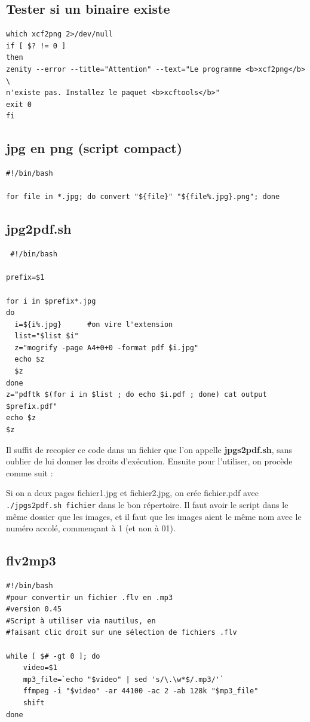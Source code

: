 \documentclass[a4paper,twoside]{article}
\begin{document}
\subsection{Tester si un binaire existe}
\begin{verbatim}
which xcf2png 2>/dev/null
if [ $? != 0 ]
then
zenity --error --title="Attention" --text="Le programme <b>xcf2png</b> \
n'existe pas. Installez le paquet <b>xcftools</b>"
exit 0
fi
\end{verbatim}


\subsection{jpg en png (script compact)}
\begin{verbatim}
#!/bin/bash

for file in *.jpg; do convert "${file}" "${file%.jpg}.png"; done
\end{verbatim}


\subsection{jpg2pdf.sh}
\begin{verbatim}
 #!/bin/bash

prefix=$1

for i in $prefix*.jpg
do
  i=${i%.jpg}      #on vire l'extension
  list="$list $i"
  z="mogrify -page A4+0+0 -format pdf $i.jpg"
  echo $z
  $z
done
z="pdftk $(for i in $list ; do echo $i.pdf ; done) cat output $prefix.pdf"
echo $z
$z
\end{verbatim}
Il suffit de recopier ce code dans un fichier que l'on appelle \textbf{jpgs2pdf.sh}, sans oublier de lui donner les droits d'exécution. Ensuite pour l'utiliser, on procède comme suit :

Si on a deux pages fichier1.jpg et fichier2.jpg, on crée fichier.pdf avec \verb|./jpgs2pdf.sh fichier| dans le bon répertoire.
Il faut avoir le script dans le même dossier que les images, et il faut que les images aient le même nom avec le numéro accolé, commençant à 1 (et non à 01).

\subsection{flv2mp3}
\begin{verbatim}
#!/bin/bash
#pour convertir un fichier .flv en .mp3
#version 0.45
#Script à utiliser via nautilus, en
#faisant clic droit sur une sélection de fichiers .flv

while [ $# -gt 0 ]; do
	video=$1
	mp3_file=`echo "$video" | sed 's/\.\w*$/.mp3/'`
	ffmpeg -i "$video" -ar 44100 -ac 2 -ab 128k "$mp3_file"
	shift
done
\end{verbatim}
\end{document}
